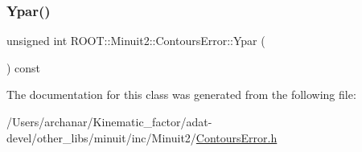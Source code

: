 \mbox{\label{classROOT_1_1Minuit2_1_1ContoursError_a3d118d7b9c49e6835130e0ce50b94b18}} 
\subsubsection{\texorpdfstring{Ypar()}{Ypar()}\hspace{0.1cm}{\footnotesize\ttfamily [3/3]}}
{\footnotesize\ttfamily unsigned int R\+O\+O\+T\+::\+Minuit2\+::\+Contours\+Error\+::\+Ypar (\begin{DoxyParamCaption}{ }\end{DoxyParamCaption}) const\hspace{0.3cm}{\ttfamily [inline]}}



The documentation for this class was generated from the following file\+:\begin{DoxyCompactItemize}
\item 
/\+Users/archanar/\+Kinematic\+\_\+factor/adat-\/devel/other\+\_\+libs/minuit/inc/\+Minuit2/\mbox{\hyperlink{adat-devel_2other__libs_2minuit_2inc_2Minuit2_2ContoursError_8h}{Contours\+Error.\+h}}\end{DoxyCompactItemize}
